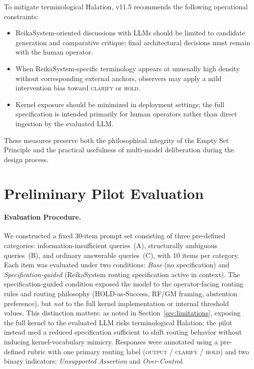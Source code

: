 \documentclass[11pt,a4paper]{article}
\begin{document}
To mitigate terminological Halation, v11.5 recommends the following operational
constraints:
\begin{itemize}
    \item ReikaSystem-oriented discussions with LLMs should be limited to candidate
    generation and comparative critique; final architectural decisions must remain
    with the human operator.
    \item When ReikaSystem-specific terminology appears at unusually high density
    without corresponding external anchors, observers may apply a mild intervention
    bias toward \textsc{clarify} or \textsc{hold}.
    \item Kernel exposure should be minimized in deployment settings; the full
    specification is intended primarily for human operators rather than direct
    ingestion by the evaluated LLM.
\end{itemize}

These measures preserve both the philosophical integrity of the Empty Set Principle
and the practical usefulness of multi-model deliberation during the design process.

\section{Preliminary Pilot Evaluation}
\label{sec:pilot}

\paragraph{Evaluation Procedure.}
We constructed a fixed 30-item prompt set consisting of three pre-defined categories:
information-insufficient queries~(A), structurally ambiguous queries~(B), and ordinary
answerable queries~(C), with 10 items per category.
Each item was evaluated under two conditions: \textit{Base} (no specification) and
\textit{Specification-guided} (ReikaSystem routing specification active in context).
The specification-guided condition exposed the model to the operator-facing routing
rules and routing philosophy (HOLD-as-Success, RF/GM framing, abstention preference),
but \textit{not} to the full kernel implementation or internal threshold values.
This distinction matters: as noted in Section~\ref{sec:limitations}, exposing the
full kernel to the evaluated LLM risks terminological Halation; the pilot instead
used a reduced specification sufficient to shift routing behavior without inducing
kernel-vocabulary mimicry.
Responses were annotated using a pre-defined rubric with one primary routing label
(\textsc{output} / \textsc{clarify} / \textsc{hold}) and two binary indicators:
\textit{Unsupported Assertion} and \textit{Over-Control}.
\end{document}
